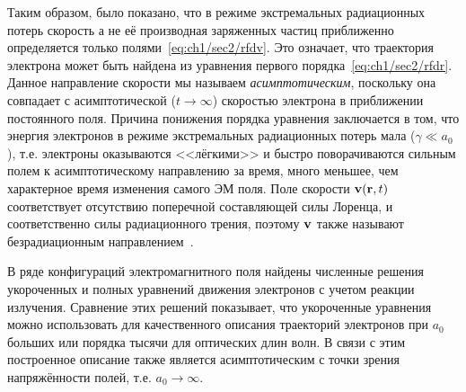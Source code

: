 Таким образом, было показано, что в режиме экстремальных радиационных потерь скорость а не её производная заряженных частиц приближенно определяется только полями~\eqref{eq:ch1/sec2/rfdv}.
Это означает, что траектория электрона может быть найдена из уравнения первого порядка~\eqref{eq:ch1/sec2/rfdr}.
Данное направление скорости мы называем \textit{асимптотическим}, поскольку она совпадает с асимптотической ($t \to
\infty$) скоростью электрона в приближении постоянного поля.
Причина понижения порядка уравнения заключается в том, что энергия электронов в режиме экстремальных радиационных потерь мала ($\gamma \ll a_0$), т.е. электроны оказываются <<лёгкими>> и быстро поворачиваются сильным полем к асимптотическому направлению за время, много меньшее, чем характерное время изменения самого ЭМ поля.
Поле скорости ${\vb v}({\vb r}, t)$ соответствует отсутствию поперечной составляющей силы Лоренца, и соответственно силы радиационного трения, поэтому $\vb v$ также называют безрадиационным направлением~\cite{Gonoskov17}.

В ряде конфигураций электромагнитного поля найдены численные решения укороченных и полных уравнений движения электронов с учетом реакции излучения.
Сравнение этих решений показывает, что укороченные уравнения можно использовать для качественного описания траекторий электронов при $a_0$ больших или порядка тысячи для оптических длин волн.
В связи с этим построенное описание также является асимптотическим с точки зрения напряжённости полей, т.е. $a_0 \to \infty$.

